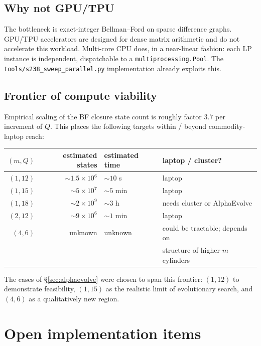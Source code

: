 \documentclass[11pt,a4paper]{article}
\theoremstyle{plain}
\theoremstyle{definition}
\begin{document}
\subsection{Why not GPU/TPU}

The bottleneck is exact-integer Bellman--Ford on sparse
difference graphs. GPU/TPU accelerators are designed for dense
matrix arithmetic and do not accelerate this workload. Multi-core
CPU does, in a near-linear fashion: each LP instance is
independent, dispatchable to a \texttt{multiprocessing.Pool}.
The \texttt{tools/s238\_sweep\_parallel.py} implementation already
exploits this.

\subsection{Frontier of compute viability}

Empirical scaling of the BF closure state count is roughly factor
$3.7$ per increment of $Q$. This places the following targets
within / beyond commodity-laptop reach:

\begin{center}\footnotesize
\begin{tabular}{rrll}
\toprule
$(m, Q)$ & estimated states & estimated time & laptop / cluster? \\
\midrule
$(1, 12)$ & ${\sim}1.5 \times 10^6$  & ${\sim}10$ s   & laptop \\
$(1, 15)$ & ${\sim}5 \times 10^7$    & ${\sim}5$ min  & laptop \\
$(1, 18)$ & ${\sim}2 \times 10^9$    & ${\sim}3$ h    & needs cluster or AlphaEvolve \\
$(2, 12)$ & ${\sim}9 \times 10^6$    & ${\sim}1$ min  & laptop \\
$(4, 6)$  & unknown                  & unknown        & could be tractable; depends on \\
          &                          &                & structure of higher-$m$ cylinders \\
\bottomrule
\end{tabular}
\end{center}

The cases of \S\ref{sec:alphaevolve} were chosen to span this
frontier: $(1, 12)$ to demonstrate feasibility, $(1, 15)$ as the
realistic limit of evolutionary search, and $(4, 6)$ as a
qualitatively new region.

\section{Open implementation items}\label{app:open-items}
\end{document}
